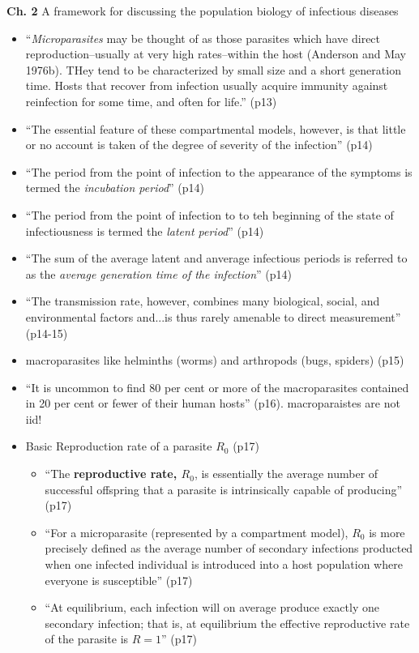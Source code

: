 \documentclass{article}
\begin{document}
\textbf{Ch. 2} A framework for discussing the population biology of infectious diseases
\begin{itemize}
\item ``\textit{Microparasites} may be thought of as those parasites which have direct reproduction--usually at very high rates--within the host (Anderson and May 1976b).  THey tend to be characterized by small size and a short generation time.  Hosts that recover from infection usually acquire immunity against reinfection for some time, and often for life.'' (p13)
\item ``The essential feature of these compartmental models, however, is that little or no account is taken of the degree of severity of the infection'' (p14)
\item ``The period from the point of infection to the appearance of the symptoms is termed the \textit{incubation period}'' (p14)
\item ``The period from the point of infection to to teh beginning of the state of infectiousness is termed the \textit{latent period}'' (p14)
\item ``The sum of the average latent and anverage infectious periods is referred to as the \textit{average generation time of the infection}'' (p14)
\item ``The transmission rate, however, combines many biological, social, and environmental factors and...is thus rarely amenable to direct measurement'' (p14-15)
\item macroparasites like helminths (worms) and arthropods (bugs, spiders) (p15)
\item ``It is uncommon to find 80 per cent or more of the macroparasites contained in 20 per cent or fewer of their human hosts'' (p16).  macroparaistes are not iid!
\item Basic Reproduction rate of a parasite $R_0$ (p17)
  \begin{itemize}
  \item ``The \textbf{reproductive rate, $R_0$}, is essentially the average number of successful offspring that a parasite is intrinsically capable of producing'' (p17)
  \item ``For a microparasite (represented by a compartment model), $R_0$ is more precisely defined as the average number of secondary infections producted when one infected individual is introduced into a host population where everyone is susceptible'' (p17)
  \item ``At equilibrium, each infection will on average produce exactly one secondary infection; that is, at equilibrium the effective reproductive rate of the parasite is $R=1$'' (p17)

\end{itemize}
\end{itemize}
\end{document}
